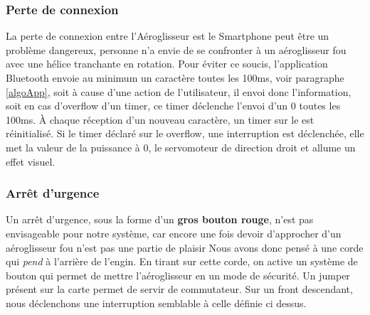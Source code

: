 				\subsubsection{Perte de connexion}
				La perte de connexion entre l'Aéroglisseur est le Smartphone peut être un problème dangereux, personne n'a envie de se confronter à un aéroglisseur fou avec une hélice tranchante en rotation. Pour éviter ce soucis, l'application Bluetooth envoie au minimum un caractère toutes les 100ms, voir paragraphe \ref{algoApp}, soit à cause d'une action de l'utilisateur, il envoi donc l'information, soit en cas d'overflow d'un timer, ce timer déclenche l'envoi d'un 0 toutes les 100ms. À chaque réception d'un nouveau caractère, un timer sur le \pic est réinitialisé. Si le timer déclaré sur le \pic overflow, une interruption est déclenchée, elle met la valeur de la puissance à 0, le servomoteur de direction droit et allume un effet visuel.
				
				\subsubsection{Arrêt d'urgence}\label{AU}
				Un arrêt d'urgence, sous la forme d'un \textbf{gros bouton rouge}, n'est pas envisageable pour notre système, car encore une fois devoir d'approcher d'un aéroglisseur fou n'est pas une partie de plaisir Nous avons donc pensé à une corde qui \textit{pend} à l'arrière de l'engin. En tirant sur cette corde, on active un système de bouton qui permet de mettre l'aéroglisseur en un mode de sécurité. Un jumper présent sur la carte permet de servir de commutateur. Sur un front descendant, nous déclenchons une interruption semblable à celle définie ci dessus.
				
				
